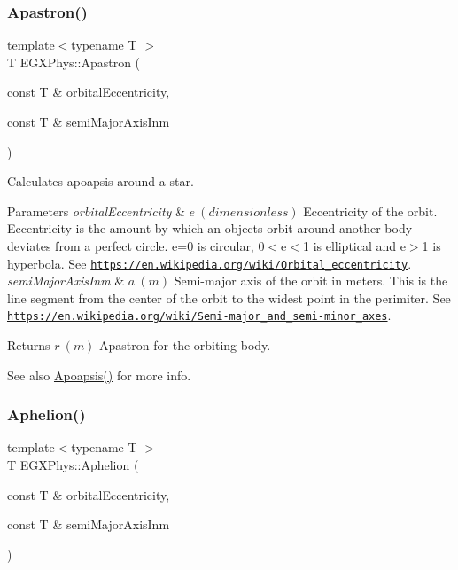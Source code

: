 \subsubsection{\texorpdfstring{Apastron()}{Apastron()}}
{\footnotesize\ttfamily template$<$typename T $>$ \\
T E\+G\+X\+Phys\+::\+Apastron (\begin{DoxyParamCaption}\item[{const T \&}]{orbital\+Eccentricity,  }\item[{const T \&}]{semi\+Major\+Axis\+Inm }\end{DoxyParamCaption})}



Calculates apoapsis around a star. 


\begin{DoxyParams}{Parameters}
{\em orbital\+Eccentricity} & $ e\ (dimensionless)$ Eccentricity of the orbit. Eccentricity is the amount by which an objects orbit around another body deviates from a perfect circle. e=0 is circular, 0$<$e$<$1 is elliptical and e$>$1 is hyperbola. See \href{https://en.wikipedia.org/wiki/Orbital_eccentricity}{\tt https\+://en.\+wikipedia.\+org/wiki/\+Orbital\+\_\+eccentricity}. \\
\hline
{\em semi\+Major\+Axis\+Inm} & $ a\ (m)$ Semi-\/major axis of the orbit in meters. This is the line segment from the center of the orbit to the widest point in the perimiter. See \href{https://en.wikipedia.org/wiki/Semi-major_and_semi-minor_axes}{\tt https\+://en.\+wikipedia.\+org/wiki/\+Semi-\/major\+\_\+and\+\_\+semi-\/minor\+\_\+axes}. \\
\hline
\end{DoxyParams}
\begin{DoxyReturn}{Returns}
$ r\ (m)$ Apastron for the orbiting body. 
\end{DoxyReturn}
\begin{DoxySeeAlso}{See also}
\mbox{\hyperlink{group___e_g_x_phys-_apoapsis_gafd08a2d1d64886e7bb9bcb7ff65bc3ea}{Apoapsis()}} for more info. 
\end{DoxySeeAlso}
\mbox{\label{group___e_g_x_phys-_apoapsis_ga31b1bd55ee4ebe33f2af6827bfe30515}} 
\subsubsection{\texorpdfstring{Aphelion()}{Aphelion()}}
{\footnotesize\ttfamily template$<$typename T $>$ \\
T E\+G\+X\+Phys\+::\+Aphelion (\begin{DoxyParamCaption}\item[{const T \&}]{orbital\+Eccentricity,  }\item[{const T \&}]{semi\+Major\+Axis\+Inm }\end{DoxyParamCaption})}



